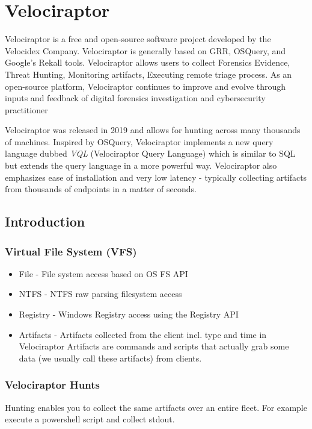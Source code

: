 

\section{Velociraptor}
Velociraptor is a free and open-source software project developed by the Velocidex Company. Velociraptor is generally based on GRR, OSQuery, and Google's Rekall tools. Velociraptor allows users to collect Forensics Evidence, Threat Hunting, Monitoring artifacts, Executing remote triage process. As an open-source platform, Velociraptor continues to improve and evolve through inputs and feedback of digital forensics investigation and cybersecurity practitioner

Velociraptor was released in 2019 and allows for hunting across many thousands of machines. Inspired by OSQuery, Velociraptor implements a new query language dubbed \textit{VQL} (Velociraptor Query Language) which is similar to SQL but extends the query language in a more powerful way. Velociraptor also emphasizes ease of installation and very low latency - typically collecting artifacts from thousands of endpoints in a matter of seconds.

\subsection{Introduction}

\subsubsection{Virtual File System (VFS)}
\begin{itemize}
    \item File - File system access based on OS FS API
    \item NTFS - NTFS raw parsing filesystem access
    \item Registry - Windows Registry access using the Registry API
    \item Artifacts - Artifacts collected from the client incl. type and time
    in Velociraptor Artifacts are commands and scripts that actually
    grab some data (we usually call these artifacts) from clients.
\end{itemize}

\subsubsection{Velociraptor Hunts}
Hunting enables you to collect the same artifacts over an entire fleet. For example execute a powershell script and collect stdout.

